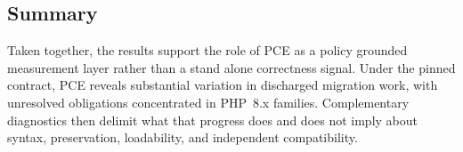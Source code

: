 \subsection{Summary}
\label{sec:tradeoffs}

Taken together, the results support the role of PCE as a policy grounded
measurement layer rather than a stand alone correctness signal. Under the
pinned contract, PCE reveals substantial variation in discharged migration
work, with unresolved obligations concentrated in PHP~8.x families.
Complementary diagnostics then delimit what that progress does and does not
imply about syntax, preservation, loadability, and independent
compatibility.